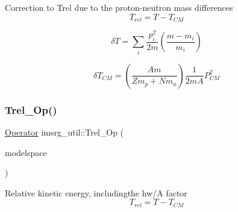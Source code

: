 Correction to Trel due to the proton-\/neutron mass differences \[ T_{rel} = T - T_{CM} \]

\[ \delta T = \sum_i \frac{p_i^2}{2m} \left( \frac{m-m_i}{m_i} \right) \]

\[ \delta T_{CM} = \left( \frac{Am}{Zm_p+Nm_n} \right) \frac{1}{2mA} P_{CM}^2 \] \mbox{\label{namespaceimsrg__util_ac417628e699933643474e0f48d9646c7}} 
\subsubsection{\texorpdfstring{Trel\+\_\+\+Op()}{Trel\_Op()}}
{\footnotesize\ttfamily \hyperlink{classOperator}{Operator} imsrg\+\_\+util\+::\+Trel\+\_\+\+Op (\begin{DoxyParamCaption}\item[{\hyperlink{classModelSpace}{Model\+Space} \&}]{modelspace }\end{DoxyParamCaption})}

Relative kinetic energy, includingthe hw/A factor \[ T_{rel} = T - T_{CM} \] 